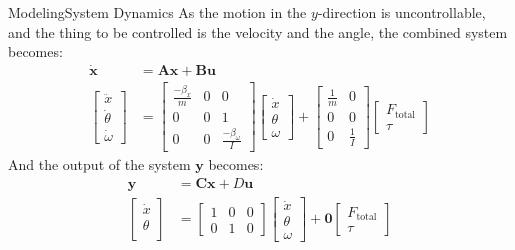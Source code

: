 \documentclass[10pt]{beamer}
\begin{document}
\begin{frame}{Modeling}{System Dynamics}
As the motion in the $y$-direction is uncontrollable, and the thing to be controlled is the velocity and the angle, the combined system becomes:
\begin{align}
\dot{\mathbf{x}} &= \mathbf{A}\mathbf{x} + \mathbf{B}\mathbf{u}\\
\begin{bmatrix}
\ddot{x}\\
\dot{\theta}\\
\dot{\omega}
\end{bmatrix} &= \begin{bmatrix}
\frac{-\beta_x}{m} & 0 & 0\\
0 & 0 & 1\\
0 & 0 & \frac{-\beta_\omega}{I}
\end{bmatrix}\begin{bmatrix}
\dot{x}\\
\theta\\
\omega
\end{bmatrix} + \begin{bmatrix}
\frac{1}{m} & 0\\
0 & 0\\
0 & \frac{1}{I}
\end{bmatrix}\begin{bmatrix}
F_\text{total}\\
\tau
\end{bmatrix}
\end{align}
And the output of the system $\mathbf{y}$ becomes:
\begin{align}
\mathbf{y} &= \mathbf{C}\mathbf{x} + D\mathbf{u}\\
\begin{bmatrix}
\dot{x}\\
\theta\\
\end{bmatrix} &= \begin{bmatrix}
 1 & 0 & 0\\
 0 & 1 & 0
\end{bmatrix}\begin{bmatrix}
\dot{x}\\
\theta\\
\omega
\end{bmatrix} + \mathbf{0}\begin{bmatrix}
F_\text{total}\\
\tau
\end{bmatrix}
\end{align}
\end{frame}
\end{document}

